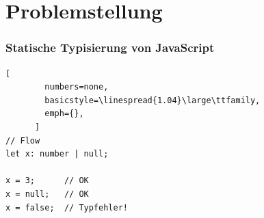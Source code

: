




  \section{Problemstellung}


    \begin{frame}[fragile]
      \frametitle{Statische Typisierung von JavaScript}
      \begin{lstlisting}[
        numbers=none,
        basicstyle=\linespread{1.04}\large\ttfamily,
        emph={},
      ]
// Flow
let x: number | null;

x = 3;      // OK
x = null;   // OK
x = false;  // Typfehler!
      \end{lstlisting}
    \end{frame}

